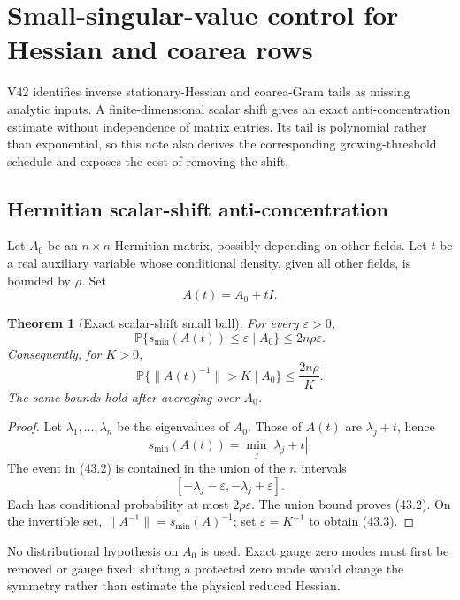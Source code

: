 \documentclass[11pt]{article}
\newtheorem{theorem}{Theorem}[section]
\begin{document}
\section{Small-singular-value control for Hessian and coarea rows}
\label{sec:v11v43}

V42 identifies inverse stationary-Hessian and coarea-Gram tails as
missing analytic inputs.  A finite-dimensional scalar shift gives an
exact anti-concentration estimate without independence of matrix
entries.  Its tail is polynomial rather than exponential, so this note
also derives the corresponding growing-threshold schedule and exposes
the cost of removing the shift.

\subsection{Hermitian scalar-shift anti-concentration}

Let \(A_0\) be an \(n\times n\) Hermitian matrix, possibly depending on
other fields.  Let \(t\) be a real auxiliary variable whose conditional
density, given all other fields, is bounded by \(\rho\).  Set
\[
 A(t)=A_0+tI.
 \tag{43.1}
\]

\begin{theorem}[Exact scalar-shift small ball]
\label{thm:v11v43-shift}
For every \(\varepsilon>0\),
\[
 \mathbb P\{
 s_{\min}(A(t))\leq\varepsilon
 \mid A_0
 \}
 \leq2n\rho\varepsilon.
 \tag{43.2}
\]
Consequently, for \(K>0\),
\[
 \mathbb P\{
 \|A(t)^{-1}\|>K
 \mid A_0
 \}
 \leq\frac{2n\rho}{K}.
 \tag{43.3}
\]
The same bounds hold after averaging over \(A_0\).
\end{theorem}

\begin{proof}
Let \(\lambda_1,\ldots,\lambda_n\) be the eigenvalues of \(A_0\).
Those of \(A(t)\) are \(\lambda_j+t\), hence
\[
 s_{\min}(A(t))
 =
 \min_j|\lambda_j+t|.
\]
The event in (43.2) is contained in the union of the \(n\) intervals
\[
 [-\lambda_j-\varepsilon,-\lambda_j+\varepsilon].
\]
Each has conditional probability at most \(2\rho\varepsilon\).
The union bound proves (43.2).  On the invertible set,
\(\|A^{-1}\|=s_{\min}(A)^{-1}\); set
\(\varepsilon=K^{-1}\) to obtain (43.3).
\end{proof}

No distributional hypothesis on \(A_0\) is used.  Exact gauge zero modes
must first be removed or gauge fixed: shifting a protected zero mode
would change the symmetry rather than estimate the physical reduced
Hessian.
\end{document}
